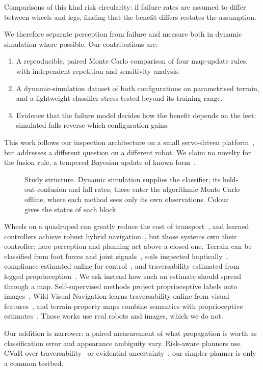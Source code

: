 \documentclass[conference,a4paper]{IEEEtran}
\makeatletter
\newcommand{\sentbreak}{\par\pagebreak\noindent}  %
\def\section{\@startsection{section}{1}{\z@}{1.5ex}{0.7ex}{\normalfont\normalsize\centering\scshape}}
\makeatother
\begin{document}
Comparisons of this kind risk circularity: if failure rates are assumed to differ between wheels and legs, finding that the benefit differs restates the assumption. \sentbreak We therefore separate perception from failure and measure both in dynamic simulation where possible. Our contributions are:
\begin{enumerate}
\item A reproducible, paired Monte Carlo comparison of four map-update rules, with independent repetition and sensitivity analysis.
\item A dynamic-simulation dataset of both configurations on parametrised terrain, and a lightweight classifier stress-tested beyond its training range.
\item Evidence that the failure model decides how the benefit depends on the feet: simulated falls reverse which configuration gains.
\end{enumerate}
This work follows our inspection architecture on a small servo-driven platform~\cite{segundo2026laccei}, but addresses a different question on a different robot. We claim no novelty for the fusion rule, a tempered Bayesian update of known form~\cite{bissiri2016}.

\begin{figure}[t]
\centering
\resizebox{\textwidth}{!}{}
\caption{Study structure. Dynamic simulation supplies the classifier, its held-out confusion and fall rates; these enter the algorithmic Monte Carlo offline, where each method sees only its own observations. Colour gives the status of each block.}
\label{fig:arch}
\end{figure}

\section{Related Work}
Wheels on a quadruped can greatly reduce the cost of transport~\cite{bjelonic2019}, and learned controllers achieve robust hybrid navigation~\cite{lee2024}, but those systems own their controller; here perception and planning act above a closed one. Terrain can be classified from foot forces and joint signals~\cite{bednarek2019}, soils inspected haptically~\cite{kolvenbach2019}, compliance estimated online for control~\cite{fahmi2020}, and traversability estimated from legged proprioception~\cite{elnoor2024}. We ask instead how such an estimate should spread through a map. Self-supervised methods project proprioceptive labels onto images~\cite{wellhausen2019}, Wild Visual Navigation learns traversability online from visual features~\cite{mattamala2025}, and terrain-property maps combine semantics with proprioceptive estimates~\cite{ewen2022}. Those works use real robots and images, which we do not. \sentbreak Our addition is narrower: a paired measurement of what propagation is worth as classification error and appearance ambiguity vary. Risk-aware planners use CVaR over traversability~\cite{fan2021} or evidential uncertainty~\cite{cai2024}; our simpler planner is only a common testbed.
\end{document}
